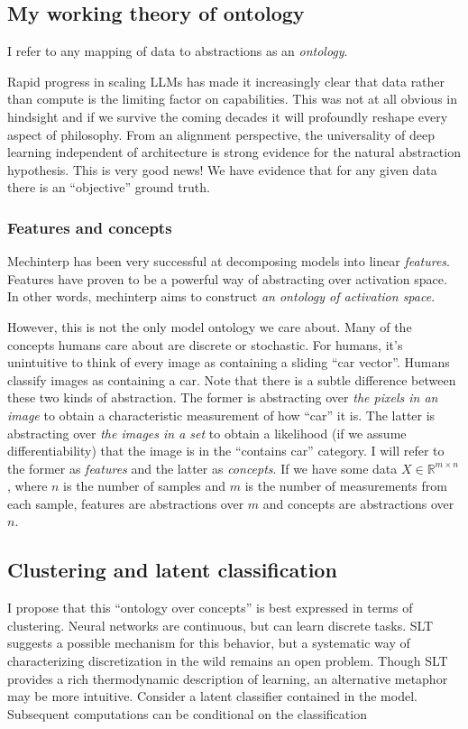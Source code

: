 \subsection{My working theory of ontology}
I refer to any mapping of data to abstractions as an \textit{ontology}.

Rapid progress in scaling LLMs has made it increasingly clear that data rather than compute is the limiting factor on capabilities.
This was not at all obvious in hindsight and if we survive the coming decades it will profoundly reshape every aspect of philosophy.
From an alignment perspective, the universality of deep learning independent of architecture is strong evidence for the natural abstraction hypothesis.
This is very good news! We have evidence that for any given data there is an ``objective'' ground truth.

\subsubsection{Features and concepts}
Mechinterp has been very successful at decomposing models into linear \textit{features}.
Features have proven to be a powerful way of abstracting over activation space.
In other words, mechinterp aims to construct \textit{an ontology of activation space}.

However, this is not the only model ontology we care about.
Many of the concepts humans care about are discrete or stochastic.
For humans, it's unintuitive to think of every image as containing a sliding ``car vector''.
Humans classify images as containing a car.
Note that there is a subtle difference between these two kinds of abstraction.
The former is abstracting over \textit{the pixels in an image} to obtain a characteristic measurement of how ``car'' it is.
The latter is abstracting over \textit{the images in a set} to obtain a likelihood (if we assume differentiability) that the image is in the ``contains car'' category.  
I will refer to the former as \textit{features} and the latter as \textit{concepts}.
If we have some data $X \in \mathbb{R}^{m \times n}$,
where $n$ is the number of samples and $m$ is the number of measurements from each sample, 
features are abstractions over $m$ and concepts are abstractions over $n$.

\subsection{Clustering and latent classification}
I propose that this ``ontology over concepts'' is best expressed in terms of clustering.
Neural networks are continuous, but can learn discrete tasks.
SLT suggests a possible mechanism for this behavior,
but a systematic way of characterizing discretization in the wild remains an open problem.
Though SLT provides a rich thermodynamic description of learning,
an alternative metaphor may be more intuitive.
Consider a latent classifier contained in the model.
Subsequent computations can be conditional on the classification

